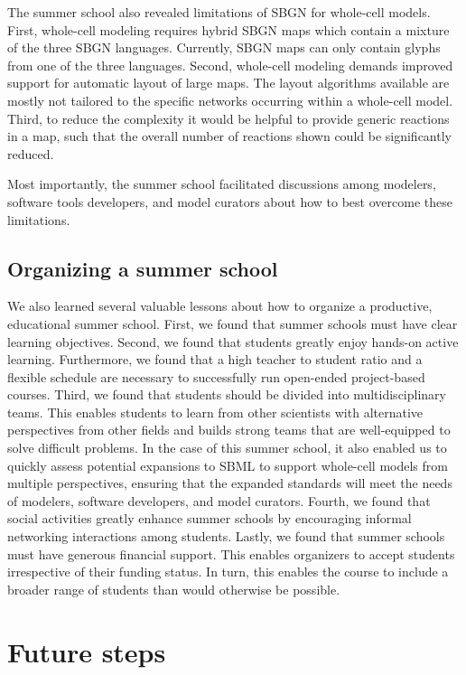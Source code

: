 \documentclass[journal,transmag]{IEEEtran}
\begin{document}
The summer school also revealed limitations of SBGN for whole-cell models. 
First, whole-cell modeling requires hybrid SBGN maps which contain a mixture of the three SBGN languages.
Currently, SBGN maps can only contain glyphs from one of the three languages.
Second, whole-cell modeling demands improved support for automatic layout of large maps. The layout algorithms available are mostly not tailored to the specific networks occurring within a whole-cell model. 
Third, to reduce the complexity it would be helpful to provide generic reactions in a map, such that the overall number of reactions shown could be significantly reduced.

Most importantly, the summer school facilitated discussions among modelers, software tools developers, and model curators about how to best overcome these limitations.

\subsection{Organizing a summer school}
We also learned several valuable lessons about how to organize a productive, educational summer school.
First, we found that summer schools must have clear learning objectives.
Second, we found that students greatly enjoy hands-on active learning. 
Furthermore, we found that a high teacher to student ratio and a flexible schedule are necessary to successfully run open-ended project-based courses.
Third, we found that students should be divided into multidisciplinary teams. 
This enables students to learn from other scientists with alternative perspectives from other fields and builds strong teams that are well-equipped to solve difficult problems.
In the case of this summer school, it also enabled us to quickly assess potential expansions to SBML to support whole-cell models from multiple perspectives, ensuring that the expanded standards will meet the needs of modelers, software developers, and model curators.
Fourth, we found that social activities greatly enhance summer schools by encouraging informal networking interactions among students.
Lastly, we found that summer schools must have generous financial support. This enables organizers to accept students irrespective of their funding status. In turn, this enables the course to include a broader range of students than would otherwise be possible.

\section{Future steps}
\end{document}
